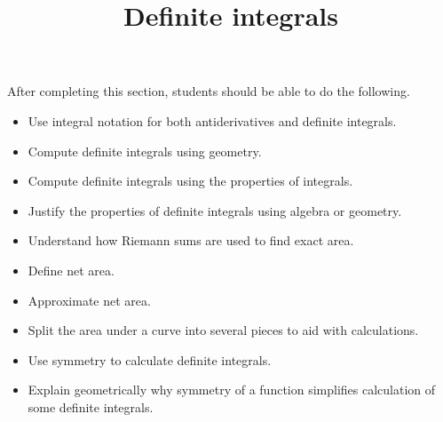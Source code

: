 \documentclass{ximera}
\title{Definite integrals}
\begin{document}
\begin{abstract}
\end{abstract}

\maketitle

\begin{sectionOutcomes}

After completing this section, students should be able to do the following.

\begin{itemize}
\item Use integral notation for both antiderivatives and definite integrals.
\item Compute definite integrals using geometry.
\item Compute definite integrals using the properties of integrals.
\item Justify the properties of definite integrals using algebra or geometry.
\item Understand how Riemann sums are used to find exact area.
\item Define net area.
\item Approximate net area.
\item Split the area under a curve into several pieces to aid with calculations.
\item Use symmetry to calculate definite integrals.
\item Explain geometrically why symmetry of a function simplifies calculation of some definite integrals.
\end{itemize}

\end{sectionOutcomes}
\end{document}
